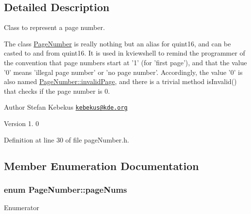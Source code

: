 \subsection{Detailed Description}
Class to represent a page number. 

The class \hyperlink{classPageNumber}{Page\+Number} is really nothing but an alias for quint16, and can be casted to and from quint16. It is used in kviewshell to remind the programmer of the convention that page numbers start at '1' (for 'first page'), and that the value '0' means 'illegal page number' or 'no page number'. Accordingly, the value '0' is also named \hyperlink{classPageNumber_a9521b37657ab0c88e07c67ab75f48b92af17674d62e6864de4cd9fd233bbd6b1d}{Page\+Number\+::invalid\+Page}, and there is a trivial method is\+Invalid() that checks if the page number is 0.

\begin{DoxyAuthor}{Author}
Stefan Kebekus \href{mailto:kebekus@kde.org}{\tt kebekus@kde.\+org} 
\end{DoxyAuthor}
\begin{DoxyVersion}{Version}
1. 0 
\end{DoxyVersion}


Definition at line 30 of file page\+Number.\+h.



\subsection{Member Enumeration Documentation}
\hypertarget{classPageNumber_a9521b37657ab0c88e07c67ab75f48b92}{
\subsubsection[{page\+Nums}]{\setlength{\rightskip}{0pt plus 5cm}enum {\bf Page\+Number\+::page\+Nums}}}\label{classPageNumber_a9521b37657ab0c88e07c67ab75f48b92}
\begin{Desc}
\item[Enumerator]\par
\begin{description}
\item[{\em 
\hypertarget{classPageNumber_a9521b37657ab0c88e07c67ab75f48b92af17674d62e6864de4cd9fd233bbd6b1d}{invalid\+Page}\label{classPageNumber_a9521b37657ab0c88e07c67ab75f48b92af17674d62e6864de4cd9fd233bbd6b1d}
}]\end{description}
\end{Desc}


